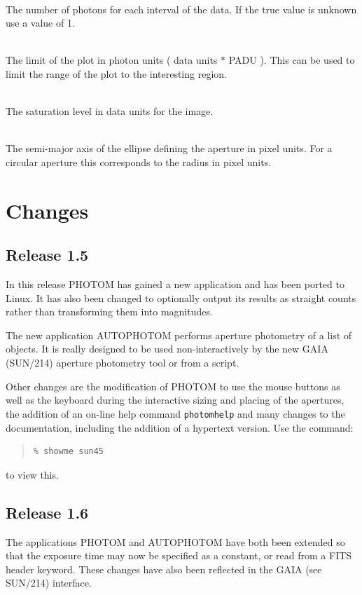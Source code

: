 \documentclass[twoside,11pt]{article}
\newcommand{\htmlref}[2]{#1}
\newcommand{\xref}[3]{#1}
\renewcommand{\_}{\texttt{\symbol{95}}}
\newcommand{\sstsubsection}[1]{ \item[{#1}] \mbox{} \\}
\newcommand{\sstsubsection}[1]{\item[{#1}]}
\begin{document}
{{{      }
      \sstsubsection{
         PADU = \_REAL (Read)
      }{
         The number of photons for each interval of the data. If the
         true value is unknown use a value of 1.
      }
      \sstsubsection{
         RANGE = \_REAL (Read)
      }{
         The limit of the plot in photon units ( data units $*$ PADU ).
         This can be used to limit the range of the plot to the
         interesting region.
      }
      \sstsubsection{
         SATURE = \_REAL (Read)
      }{
         The saturation level in data units for the image.
      }
      \sstsubsection{
         SEMIM = \_REAL (Read)
      }{
         The semi-major axis of the ellipse defining the aperture in
         pixel units. For a circular aperture this corresponds to the
         radius in pixel units.
      }
   }
}

\section{Changes}
\subsection{Release 1.5}

In this release PHOTOM has gained a new application and has been
ported to Linux. It has also been changed to optionally output its
results as straight counts rather than transforming them into
magnitudes.

The new application AUTOPHOTOM performs aperture photometry of a list
of objects. It is really designed to be used non-interactively by the
new GAIA (\xref{SUN/214}{sun214}{}) aperture photometry tool or from a
script.

Other changes are the modification of PHOTOM to use the mouse
buttons as well as the keyboard during the interactive sizing and
placing of the apertures, the addition of an on-line help command
\texttt{photomhelp} and many changes to the documentation, including the
addition of a hypertext version. Use the command:
\begin{quote}
\begin{verbatim}
% showme sun45
\end{verbatim}
\end{quote}
to view this.

\subsection{Release 1.6}
The applications \htmlref{PHOTOM}{PHOTOM} and
\htmlref{AUTOPHOTOM}{AUTOPHOTOM} have both been extended so that the
exposure time may now be specified as a constant, or read from a FITS
header keyword. These changes have also been reflected in the GAIA
(see \xref{SUN/214}{sun214}{}) interface.
\end{document}

